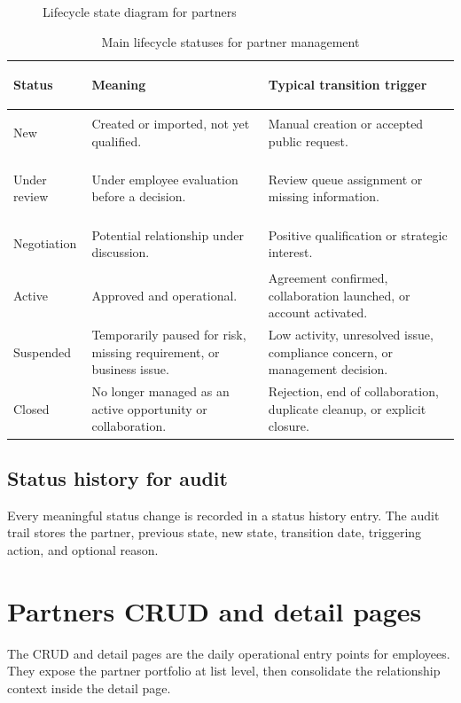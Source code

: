 \begin{figure}[htbp]
  \centering
  \caption{Lifecycle state diagram for partners}
\end{figure}

\begin{table}[H]
  \centering
  \caption{Main lifecycle statuses for partner management}
  \begin{tabularx}{\textwidth}{>{\bfseries\raggedright\arraybackslash}p{3cm}X X}
    \toprule
    Status & Meaning & Typical transition trigger \\
    \midrule
    New & Created or imported, not yet qualified. & Manual creation or accepted public request. \\
    Under review & Under employee evaluation before a decision. & Review queue assignment or missing information. \\
    Negotiation & Potential relationship under discussion. & Positive qualification or strategic interest. \\
    Active & Approved and operational. & Agreement confirmed, collaboration launched, or account activated. \\
    Suspended & Temporarily paused for risk, missing requirement, or business issue. & Low activity, unresolved issue, compliance concern, or management decision. \\
    Closed & No longer managed as an active opportunity or collaboration. & Rejection, end of collaboration, duplicate cleanup, or explicit closure. \\
    \bottomrule
  \end{tabularx}
\end{table}

\subsection{Status history for audit}
Every meaningful status change is recorded in a status history entry. The audit trail stores the partner, previous state, new state, transition date, triggering action, and optional reason.

\section{Partners CRUD and detail pages}
The CRUD and detail pages are the daily operational entry points for employees. They expose the partner portfolio at list level, then consolidate the relationship context inside the detail page.

